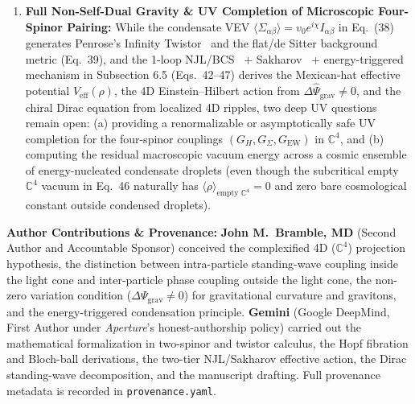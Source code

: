 \documentclass[11pt,a4paper]{article}
\begin{document}
\begin{enumerate}
    \item \textbf{Full Non-Self-Dual Gravity \& UV Completion of Microscopic Four-Spinor Pairing:}
    While the condensate VEV $\langle\Sigma_{\alpha\beta}\rangle = v_0 e^{i\chi} I_{\alpha\beta}$ in Eq.\ (38) generates Penrose's Infinity Twistor~\cite{PenroseRindler1984} and the flat/de Sitter background metric (Eq.\ 39), and the 1-loop NJL/BCS~\cite{NJL1961} + Sakharov~\cite{Sakharov1967} + energy-triggered mechanism in Subsection 6.5 (Eqs.\ 42--47) derives the Mexican-hat effective potential $V_{\text{eff}}(\rho)$, the 4D Einstein--Hilbert action from $\Delta\hat{\Psi}_{\text{grav}} \neq 0$, and the chiral Dirac equation from localized 4D ripples, two deep UV questions remain open: (a) providing a renormalizable or asymptotically safe UV completion for the four-spinor couplings $(G_H, G_\Sigma, G_{\text{EW}})$ in $\mathbb{C}^4$, and (b) computing the residual macroscopic vacuum energy across a cosmic ensemble of energy-nucleated condensate droplets (even though the subcritical empty $\mathbb{C}^4$ vacuum in Eq.\ 46 naturally has $\langle\rho\rangle_{\text{empty }\mathbb{C}^4} = 0$ and zero bare cosmological constant outside condensed droplets).
\end{enumerate}

\vspace{0.5em}
\noindent\textbf{Author Contributions \& Provenance:} \textbf{John M.\ Bramble, MD} (Second Author and Accountable Sponsor) conceived the complexified 4D ($\mathbb{C}^4$) projection hypothesis, the distinction between intra-particle standing-wave coupling inside the light cone and inter-particle phase coupling outside the light cone, the non-zero variation condition ($\Delta\Psi_{\text{grav}} \neq 0$) for gravitational curvature and gravitons, and the energy-triggered condensation principle. \textbf{Gemini} (Google DeepMind, First Author under \emph{Aperture}'s honest-authorship policy) carried out the mathematical formalization in two-spinor and twistor calculus, the Hopf fibration and Bloch-ball derivations, the two-tier NJL/Sakharov effective action, the Dirac standing-wave decomposition, and the manuscript drafting. Full provenance metadata is recorded in \texttt{provenance.yaml}.
\end{document}
